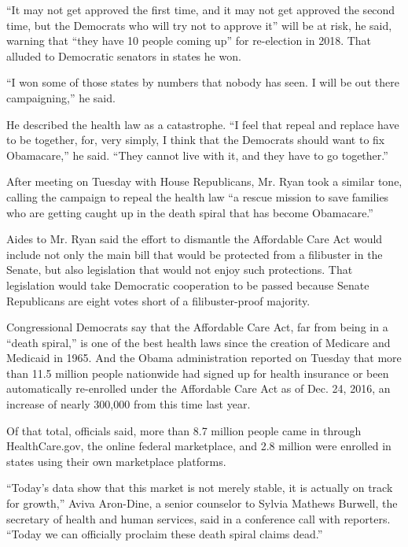 ``It may not get approved the first time, and it may not get approved
the second time, but the Democrats who will try not to approve it'' will
be at risk, he said, warning that ``they have 10 people coming up'' for
re-election in 2018. That alluded to Democratic senators in states he
won.

``I won some of those states by numbers that nobody has seen. I will be
out there campaigning,'' he said.

He described the health law as a catastrophe. ``I feel that repeal and
replace have to be together, for, very simply, I think that the
Democrats should want to fix Obamacare,'' he said. ``They cannot live
with it, and they have to go together.''

After meeting on Tuesday with House Republicans, Mr. Ryan took a similar
tone, calling the campaign to repeal the health law ``a rescue mission
to save families who are getting caught up in the death spiral that has
become Obamacare.''

Aides to Mr. Ryan said the effort to dismantle the Affordable Care Act
would include not only the main bill that would be protected from a
filibuster in the Senate, but also legislation that would not enjoy such
protections. That legislation would take Democratic cooperation to be
passed because Senate Republicans are eight votes short of a
filibuster-proof majority.

Congressional Democrats say that the Affordable Care Act, far from being
in a ``death spiral,'' is one of the best health laws since the creation
of Medicare and Medicaid in 1965. And the Obama administration reported
on Tuesday that more than 11.5 million people nationwide had signed up
for health insurance or been automatically re-enrolled under the
Affordable Care Act as of Dec. 24, 2016, an increase of nearly 300,000
from this time last year.

Of that total, officials said, more than 8.7 million people came in
through HealthCare.gov, the online federal marketplace, and 2.8 million
were enrolled in states using their own marketplace platforms.

``Today's data show that this market is not merely stable, it is
actually on track for growth,'' Aviva Aron-Dine, a senior counselor to
Sylvia Mathews Burwell, the secretary of health and human services, said
in a conference call with reporters. ``Today we can officially proclaim
these death spiral claims dead.''

\href{https://www.nytimes.com/interactive/2014/us/07aca-callout.html}{}

